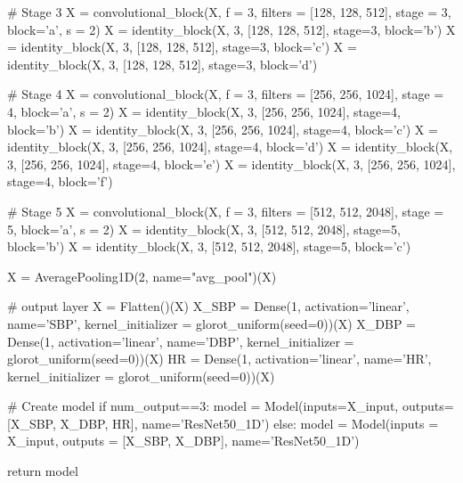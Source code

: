\begin{python}
    # Stage 3
    X = convolutional_block(X, f = 3, filters = [128, 128, 512], stage = 3, block='a', s = 2)
    X = identity_block(X, 3, [128, 128, 512], stage=3, block='b')
    X = identity_block(X, 3, [128, 128, 512], stage=3, block='c')
    X = identity_block(X, 3, [128, 128, 512], stage=3, block='d')

    # Stage 4
    X = convolutional_block(X, f = 3, filters = [256, 256, 1024], stage = 4, block='a', s = 2)
    X = identity_block(X, 3, [256, 256, 1024], stage=4, block='b')
    X = identity_block(X, 3, [256, 256, 1024], stage=4, block='c')
    X = identity_block(X, 3, [256, 256, 1024], stage=4, block='d')
    X = identity_block(X, 3, [256, 256, 1024], stage=4, block='e')
    X = identity_block(X, 3, [256, 256, 1024], stage=4, block='f')

    # Stage 5
    X = convolutional_block(X, f = 3, filters = [512, 512, 2048], stage = 5, block='a', s = 2)
    X = identity_block(X, 3, [512, 512, 2048], stage=5, block='b')
    X = identity_block(X, 3, [512, 512, 2048], stage=5, block='c')

    X = AveragePooling1D(2, name="avg_pool")(X)

    # output layer
    X = Flatten()(X)
    X_SBP = Dense(1, activation='linear', name='SBP', kernel_initializer = glorot_uniform(seed=0))(X)
    X_DBP = Dense(1, activation='linear', name='DBP', kernel_initializer = glorot_uniform(seed=0))(X)
    HR = Dense(1, activation='linear', name='HR', kernel_initializer = glorot_uniform(seed=0))(X)
    
    # Create model
    if num_output==3:
        model = Model(inputs=X_input, outputs=[X_SBP, X_DBP, HR], name='ResNet50_1D')
    else:
        model = Model(inputs = X_input, outputs = [X_SBP, X_DBP], name='ResNet50_1D')

    return model
\end{python}

